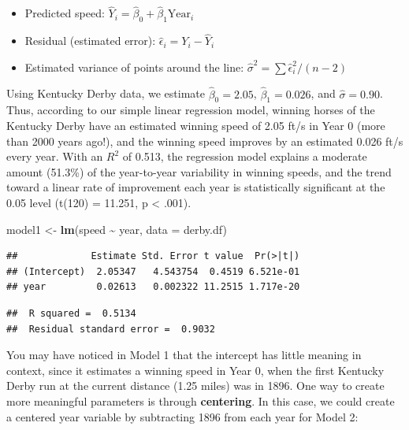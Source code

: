 \documentclass[
]{krantz}
\newenvironment{Shaded}{\begin{snugshade}}{\end{snugshade}}
\newcommand{\AttributeTok}[1]{\textcolor[rgb]{0.27,0.27,0.27}{#1}}
\newcommand{\FunctionTok}[1]{\textcolor[rgb]{0.27,0.27,0.27}{\textbf{#1}}}
\newcommand{\NormalTok}[1]{#1}
\newcommand{\OtherTok}[1]{\textcolor[rgb]{0.37,0.37,0.37}{#1}}
\newcommand{\SpecialCharTok}[1]{\textcolor[rgb]{0.43,0.43,0.43}{\textbf{#1}}}
\providecommand{\tightlist}{%
  \setlength{\itemsep}{0pt}\setlength{\parskip}{0pt}}
\begin{document}
\begin{itemize}
\tightlist
\item
  Predicted speed: \(\hat{Y}_{i}=\hat{\beta}_{0}+\hat{\beta}_{1}\textrm{Year}_{i}\)
\item
  Residual (estimated error): \(\hat{\epsilon}_{i}=Y_{i} - \hat{Y}_{i}\)
\item
  Estimated variance of points around the line: \(\hat{\sigma}^2 = \sum \hat{\epsilon}^2_{i} / (n-2)\)
\end{itemize}

Using Kentucky Derby data, we estimate \(\hat{\beta}_{0}=2.05\), \(\hat{\beta}_{1}=0.026\), and \(\hat{\sigma}=0.90\). Thus, according to our simple linear regression model, winning horses of the Kentucky Derby have an estimated winning speed of 2.05 ft/s in Year 0 (more than 2000 years ago!), and the winning speed improves by an estimated 0.026 ft/s every year. With an \(R^2\) of 0.513, the regression model explains a moderate amount (51.3\%) of the year-to-year variability in winning speeds, and the trend toward a linear rate of improvement each year is statistically significant at the 0.05 level (t(120) = 11.251, p \textless{} .001).

\begin{Shaded}
\begin{Highlighting}[]
\NormalTok{model1 }\OtherTok{\textless{}{-}} \FunctionTok{lm}\NormalTok{(speed }\SpecialCharTok{\textasciitilde{}}\NormalTok{ year, }\AttributeTok{data =}\NormalTok{ derby.df)}
\end{Highlighting}
\end{Shaded}

\begin{verbatim}
##             Estimate Std. Error t value  Pr(>|t|)
## (Intercept)  2.05347   4.543754  0.4519 6.521e-01
## year         0.02613   0.002322 11.2515 1.717e-20
\end{verbatim}

\begin{verbatim}
##  R squared =  0.5134 
##  Residual standard error =  0.9032
\end{verbatim}

You may have noticed in Model 1 that the intercept has little meaning in context, since it estimates a winning speed in Year 0, when the first Kentucky Derby run at the current distance (1.25 miles) was in 1896. One way to create more meaningful parameters is through \textbf{centering}.  In this case, we could create a centered year variable by subtracting 1896 from each year for Model 2:
\end{document}
